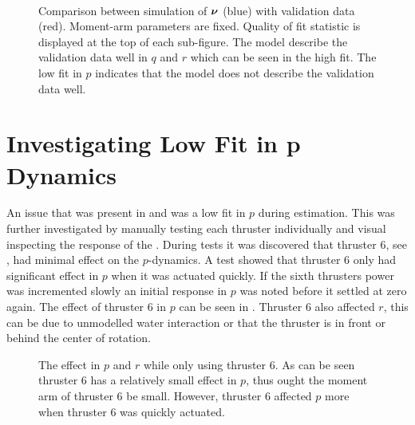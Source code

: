 \begin{figure}[tbp]
  \centering
  \qquad
  \\
  \caption{\label{fig:ResultKalmanFixedMomentArms}%
    Comparison between simulation of $\boldsymbol{\nu}$ (blue) with validation data (red). Moment-arm parameters are fixed. Quality of fit statistic is displayed at the top of each sub-figure. The model describe the validation data well in $q$ and $r$ which can be seen in the high fit. The low fit in $p$ indicates that the model does not describe the validation data well.}
\end{figure}


\section{Investigating Low Fit in p Dynamics}\label{sec:pdyn}
An issue that was present in  and  was a low fit in $p$ during estimation. This was further investigated by manually testing each thruster individually and visual inspecting the response of the \abbrROV. During tests it was discovered that thruster 6, see , had minimal effect on the $p$-dynamics. A test showed that thruster 6 only had significant effect in $p$ when it was actuated quickly. If the sixth thrusters power was incremented slowly an initial response in $p$ was noted before it settled at zero again. The effect of thruster 6 in $p$ can be seen in . Thruster 6 also affected $r$, this can be due to unmodelled water interaction or that the thruster is in front or behind the center of rotation.

\begin{figure}
\centering
  \qquad
  \qquad
  \caption{\label{fig:thruster6}%
  The effect in $p$ and $r$ while only using thruster 6. As can be seen thruster 6 has a relatively small effect in $p$, thus ought the moment arm of thruster 6 be small. However, thruster 6 affected $p$ more when thruster 6 was quickly actuated.}
\end{figure}

